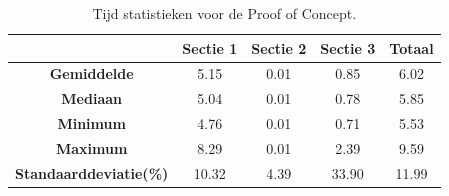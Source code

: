 \begin{table}[ht]
    \centering
    \renewcommand{\arraystretch}{1.5}
    \setlength{\tabcolsep}{12pt}
\begin{tabular}{>{\columncolor[HTML]{4CA2D5}}ccccc}
        \rowcolor[HTML]{4CA2D5}
        & \textbf{Sectie 1} & \textbf{Sectie 2} & \textbf{Sectie 3} & \textbf{Totaal} \\ \hline
        \textbf{Gemiddelde} & 5.15        & 0.01        & 0.85        & 6.02        \\ \hline
        \textbf{Mediaan}  & 5.04        & 0.01        & 0.78        & 5.85        \\ \hline
        \textbf{Minimum}     & 4.76        & 0.01        & 0.71        & 5.53        \\ \hline
        \textbf{Maximum}     & 8.29        & 0.01        & 2.39        & 9.59        \\ \hline
        \textbf{Standaarddeviatie(\%)}     &10.32        &4.39        &33.90        &11.99     \\ \hline
    \end{tabular}
\caption{Tijd statistieken voor de Proof of Concept.}
\label{fig:time_table}
\end{table}









